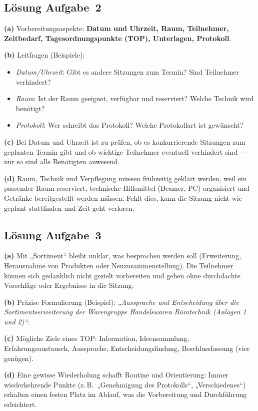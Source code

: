 \documentclass[11pt, a4paper]{article}
\begin{document}
\subsection*{Lösung Aufgabe~2}
\begin{loesung}
\textbf{(a)} Vorbereitungsaspekte: \textbf{Datum und Uhrzeit, Raum, Teilnehmer, Zeitbedarf,
Tagesordnungspunkte (TOP), Unterlagen, Protokoll}.

\textbf{(b)} Leitfragen (Beispiele):
\begin{itemize}[itemsep=0pt]
  \item \emph{Datum/Uhrzeit}: Gibt es andere Sitzungen zum Termin? Sind Teilnehmer verhindert?
  \item \emph{Raum}: Ist der Raum geeignet, verfügbar und reserviert? Welche Technik wird benötigt?
  \item \emph{Protokoll}: Wer schreibt das Protokoll? Welche Protokollart ist gewünscht?
\end{itemize}

\textbf{(c)} Bei Datum und Uhrzeit ist zu prüfen, ob es konkurrierende Sitzungen zum
geplanten Termin gibt und ob wichtige Teilnehmer eventuell verhindert sind --- nur so sind
alle Benötigten anwesend.

\textbf{(d)} Raum, Technik und Verpflegung müssen frühzeitig geklärt werden, weil ein
passender Raum reserviert, technische Hilfsmittel (Beamer, PC) organisiert und Getränke
bereitgestellt werden müssen. Fehlt dies, kann die Sitzung nicht wie geplant stattfinden
und Zeit geht verloren.
\end{loesung}

\subsection*{Lösung Aufgabe~3}
\begin{loesung}
\textbf{(a)} Mit „Sortiment“ bleibt unklar, was besprochen werden soll (Erweiterung,
Herausnahme von Produkten oder Neuzusammenstellung). Die Teilnehmer können sich gedanklich
nicht gezielt vorbereiten und gehen ohne durchdachte Vorschläge oder Ergebnisse in die
Sitzung.

\textbf{(b)} Präzise Formulierung (Beispiel): \emph{„Aussprache und Entscheidung über die
Sortimentserweiterung der Warengruppe Handelswaren Bürotechnik (Anlagen 1 und 2)“}.

\textbf{(c)} Mögliche Ziele eines TOP: Information, Ideensammlung, Erfahrungsaustausch,
Aussprache, Entscheidungsfindung, Beschlussfassung (vier genügen).

\textbf{(d)} Eine gewisse Wiederholung schafft Routine und Orientierung: Immer
wiederkehrende Punkte (z.\,B.\ „Genehmigung des Protokolls“, „Verschiedenes“) erhalten einen
festen Platz im Ablauf, was die Vorbereitung und Durchführung erleichtert.
\end{loesung}
\end{document}
